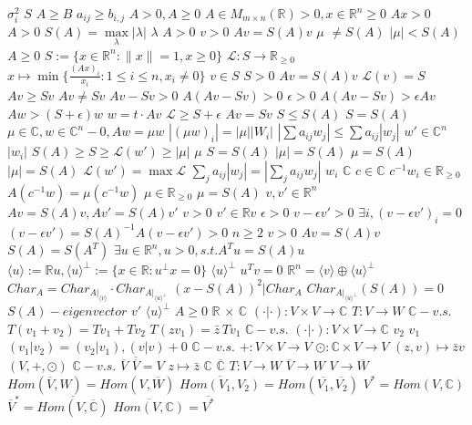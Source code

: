 \documentclass{article}
\begin{document}
$\sigma_i^2$
$S$
$A \geq B$
$a_{ij}\geq b_{i,j}$
$A>0,A\geq0$
$A \in M_{m \times n}(\mathbb{R})>0, x \in \mathbb{R}^n\geq0$
$Ax>0$
$A>0$
$S(A)=\max\limits_{\lambda}|\lambda|$
$\lambda$
$A>0$
$v>0$
$Av=S(A)v$
$\mu$
$\neq S(A)$
$|\mu|<S(A)$
$A\geq0$
$S:=\{x\in \mathbb{R}^n:\lVert x \rVert=1,x\geq0\}$
$\mathcal{L}:S \rightarrow \mathbb{R}_{\geq0}$
$x \mapsto \min\{\frac{(Ax)_i}{x_i}:1 \leq i \leq n, x_i \neq 0\}$
$v \in S$
$S>0$
$Av=S(A)v$
$\mathcal{L}(v)=S$
$Av \geq Sv$
$Av\neq Sv$
$Av-Sv>0$
$A(Av-Sv)>0$
$\epsilon>0$
$A(Av-Sv)>\epsilon Av$
$Aw>(S+\epsilon)w$
$w=t\cdot Av$
$\mathcal{L} \geq S+\epsilon$
$Av=Sv$
$S \leq S(A)$
$S=S(A)$
$\mu\in\mathbb{C}, w\in \mathbb{C}^n-{0}, Aw=\mu w$
$|(\mu w)_i|=|\mu||W_i|$
$|\sum a_{ij}w_j| \leq \sum a_{ij}|w_j|$
$w'\in\mathbb{C}^n$
$|w_i|$
$S(A) \geq S \geq \mathcal{L}(w') \geq |\mu|$
$\mu$
$S=S(A)$
$|\mu|=S(A)$
$\mu=S(A)$
$|\mu|=S(A)$
$\mathcal{L}(w')=\max \mathcal{L}$
$\sum\limits_{j}a_{ij}|w_j|=|\sum\limits_j a_{ij}w_j|$
$w_i$
$\mathbb{C}$
$c \in \mathbb{C}$
$c^{-1}w_i \in \mathbb{R}_{\geq0}$
$A(c^{-1}w)=\mu(c^{-1}w)$
$\mu \in \mathbb{R}_{\geq 0}$
$\mu=S(A)$
$v,v' \in \mathbb{R}^n$
$Av=S(A)v,Av'=S(A)v'$
$v>0$
$v' \in \mathbb{R}v$
$\epsilon>0$
$v-\epsilon v'>0$
$\exists i,(v-\epsilon v')_i=0$
$(v-\epsilon v')=S(A)^{-1}A(v-\epsilon v')>0$
$n \geq 2$
$v>0$
$Av=S(A)v$
$S(A)=S(A^T)$
$\exists u\in\mathbb{R}^n,u>0,s.t.A^Tu=S(A)u$
$\langle u \rangle:=\mathbb{R}u, \langle u \rangle^{\perp}:=\{x\in\mathbb{R}:u^{\perp}x=0\}$
$\langle u \rangle^{\perp}$
$u^Tv=0$
$\mathbb{R}^n=\langle v\rangle \oplus \langle u \rangle^{\perp}$
$Char_A=Char_{A|_{\langle v \rangle}} \cdot Char_{A|_{\langle u \rangle^{\perp}}}$
$(x-S(A))^2|Char_A$
$Char_{A|_{\langle u \rangle^{\perp}}}(S(A))=0$
$S(A)-eigenvector$
$v'$
$\langle u \rangle^{\perp}$
$A \geq 0$
$\mathbb{R}$
$\times$
$\mathbb{C}$
$(\cdot|\cdot):V\times V \rightarrow \mathbb{C}$
$T:V\rightarrow W$
$\mathbb{C}-v.s.$
$T(v_1+v_2)=Tv_1+Tv_2$
$T(zv_1)=\bar{z}\,Tv_1$
$\mathbb{C} -v.s.$
$(\cdot|\cdot):V\times V \rightarrow \mathbb{C}$
$v_2$
$v_1$
$(v_1|v_2)=(v_2|v_1),(v|v)+0$
$\mathbb{C}-v.s.$
$+:V\times V\rightarrow V$
$\odot:\mathbb{C}\times V\rightarrow V$
$(z,v) \mapsto \bar{z} v$
$(V,+,\odot)$
$\mathbb{C}-v.s.$
$\overline{V}$
$\overline{\overline{V}}=V$
$z\mapsto \bar{z}$
$\mathbb{C}$
$\overline{\mathbb{C}}$
$T:V\rightarrow W$
$\overline{V} \rightarrow W$
$V \rightarrow \overline{W}$
$Hom(\overline{V},W)=Hom(V,\overline{W})$
$\overline{Hom(V_1,V_2)}=Hom(\overline{V_1},\overline{V_2})$
$V^*=Hom(V,\mathbb{C})$
$\overline{V}^*=\overline{Hom(V,\overline{\mathbb{C}})}$
$\overline{Hom(V,\mathbb{C})}=\overline{V^*}$
\end{document}
